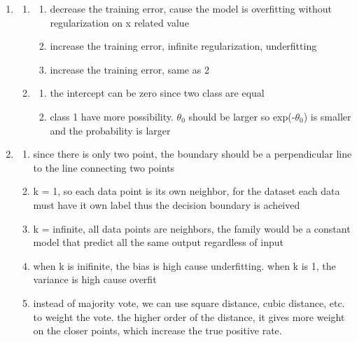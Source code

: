 \documentclass[12pt]{article}
\begin{document}
\begin{enumerate}
\item
\begin{enumerate}
\item 
\begin{enumerate}
    \item decrease the training error, cause the model is overfitting without regularization on x related value
    \item increase the training error, infinite regularization, underfitting
    \item increase the training error, same as 2
\end{enumerate}
\item
\begin{enumerate}
    \item the intercept can be zero since two class are equal
    \item class 1 have more possibility. $\theta_0$ should be larger so exp(-$\theta_0$) is smaller and the probability is larger
\end{enumerate}
\end{enumerate}

\item
\begin{enumerate}
\item since there is only two point, the boundary should be a perpendicular line to the line connecting two points
\item k =  1, so each data point is its own neighbor, for the dataset each data must have it own label thus the decision boundary is acheived
\item k = infinite, all data points are neighbors, the family would be a constant model that predict all the same output regardless of input 
\item when k is inifinite, the bias is high cause underfitting. when k is 1, the variance is high cause overfit
\item instead of majority vote, we can use square distance, cubic distance, etc. to weight the vote. the higher order of the distance, it gives more weight on the closer points, which increase the true positive rate.  
\end {enumerate}


\end{enumerate}
\end{document}
